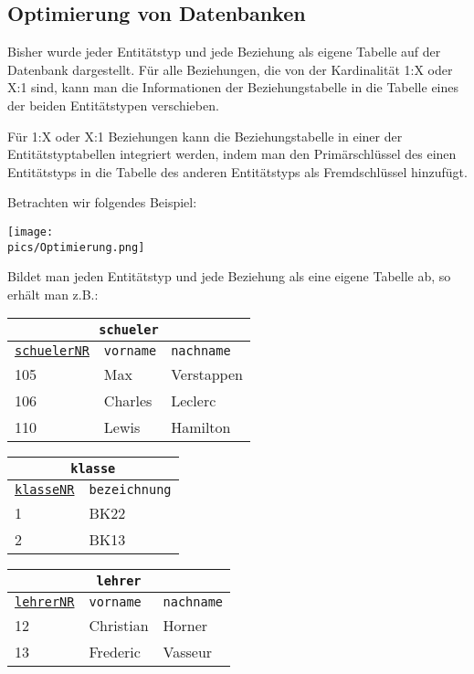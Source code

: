 \subsection[Optimierung]{Optimierung von Datenbanken}
Bisher wurde jeder Entitätstyp und jede Beziehung als eigene Tabelle auf der Datenbank dargestellt. Für alle Beziehungen, die von der Kardinalität 1:X oder X:1 sind, kann man die Informationen der Beziehungstabelle in die Tabelle eines der beiden Entitätstypen verschieben.
\begin{tcolorbox}[title=Optimierung]
	Für 1:X oder X:1 Beziehungen kann die Beziehungstabelle in einer der Entitätstyptabellen integriert werden, indem man den Primärschlüssel des einen Entitätstyps in die Tabelle des anderen Entitätstyps als Fremdschlüssel hinzufügt.
\end{tcolorbox}
Betrachten wir folgendes Beispiel:
\begin{minipage}{\textwidth}
	\centering\texttt{[image: \\pics/Optimierung.png]}\\
\end{minipage}
Bildet man jeden Entitätstyp und jede Beziehung als eine eigene Tabelle ab, so erhält man z.B.:
\begin{minipage}{\textwidth}
	\begin{minipage}{0.5\textwidth}
		\begin{tabular}{lll}
			\multicolumn{3}{c}{\lstinline!schueler!}\\
			\hline
			\underline{\lstinline!schuelerNR!}&\lstinline!vorname!&\lstinline!nachname!\\
			\hline
			105&Max&Verstappen\\
			106&Charles&Leclerc\\
			110&Lewis&Hamilton\\
		\end{tabular}
	\end{minipage}
	\begin{minipage}{0.5\textwidth}
		\begin{tabular}{ll}
			\multicolumn{2}{c}{\lstinline!klasse!}\\
			\hline
			\underline{\lstinline!klasseNR!}&\lstinline!bezeichnung!\\
			\hline
			1&BK22\\
			2&BK13\\
		\end{tabular}
	\end{minipage}
\end{minipage}
\begin{minipage}{0.3\textwidth}
	\begin{tabular}{lll}
		\multicolumn{3}{c}{\lstinline!lehrer!}\\
		\hline
		\underline{\lstinline!lehrerNR!}&\lstinline!vorname!&\lstinline!nachname!\\
		\hline
		12&Christian&Horner\\
		13&Frederic&Vasseur\\
	\end{tabular}
\end{minipage}
